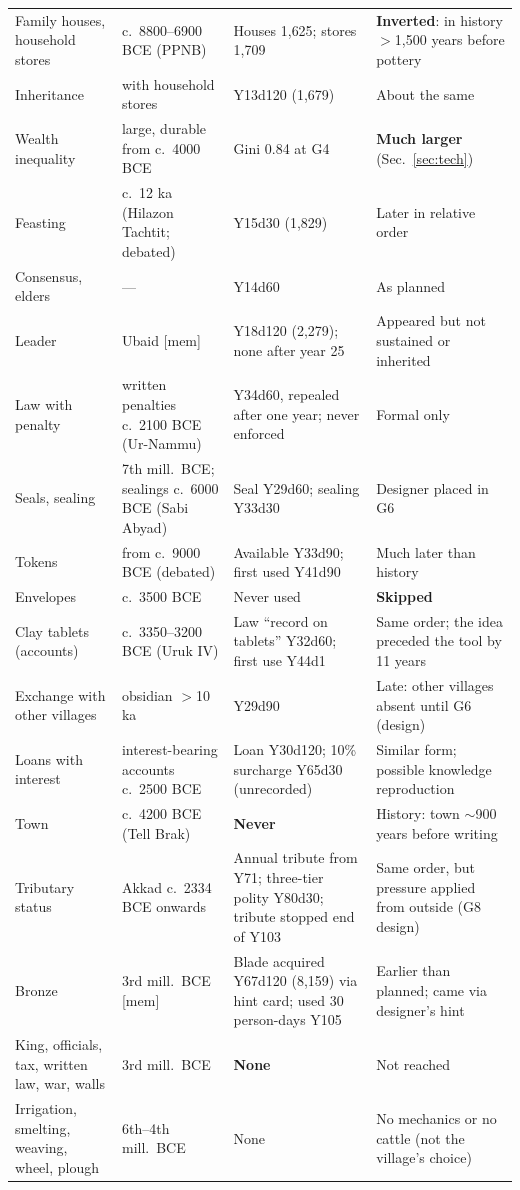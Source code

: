 \documentclass[11pt]{article}
\newcommand{\lbl}[1]{\textsf{[#1]}}
\begin{document}
\begin{table}[p]
\begin{tabularx}{\linewidth}{@{}>{\raggedright\arraybackslash}p{2.4cm} >{\raggedright\arraybackslash}p{3.4cm} L L@{}}
Family houses, household stores & c.\ 8800--6900 BCE (PPNB) & Houses 1{,}625; stores 1{,}709 & \textbf{Inverted}: in history $>$1{,}500 years before pottery \\
Inheritance & with household stores & Y13d120 (1{,}679) & About the same \\
Wealth inequality & large, durable from c.\ 4000 BCE \citep{bogaard2019farming} & Gini 0.84 at G4 & \textbf{Much larger} (Sec.~\ref{sec:tech}) \\
Feasting & c.\ 12 ka (Hilazon Tachtit; debated) & Y15d30 (1{,}829) & Later in relative order \\
Consensus, elders & --- & Y14d60 & As planned \\
Leader & Ubaid \lbl{mem} & Y18d120 (2{,}279); none after year 25 & Appeared but not sustained or inherited \\
Law with penalty & written penalties c.\ 2100 BCE (Ur-Nammu) & Y34d60, repealed after one year; never enforced & Formal only \\
Seals, sealing & 7th mill.\ BCE; sealings c.\ 6000 BCE (Sabi Abyad) & Seal Y29d60; sealing Y33d30 & Designer placed in G6 \\
Tokens & from c.\ 9000 BCE (debated) & Available Y33d90; first used Y41d90 & Much later than history \\
Envelopes & c.\ 3500 BCE & Never used & \textbf{Skipped} \\
Clay tablets (accounts) & c.\ 3350--3200 BCE (Uruk IV) & Law ``record on tablets'' Y32d60; first use Y44d1 & Same order; the idea preceded the tool by 11 years \\
Exchange with other villages & obsidian $>$10 ka & Y29d90 & Late: other villages absent until G6 (design) \\
Loans with interest & interest-bearing accounts c.\ 2500 BCE & Loan Y30d120; 10\% surcharge Y65d30 (unrecorded) & Similar form; possible knowledge reproduction \\
Town & c.\ 4200 BCE (Tell Brak) & \textbf{Never} & History: town $\sim$900 years before writing \\
Tributary status & Akkad c.\ 2334 BCE onwards & Annual tribute from Y71; three-tier polity Y80d30; tribute stopped end of Y103 & Same order, but pressure applied from outside (G8 design) \\
Bronze & 3rd mill.\ BCE \lbl{mem} & Blade acquired Y67d120 (8{,}159) via hint card; used 30 person-days Y105 & Earlier than planned; came via designer's hint \\
King, officials, tax, written law, war, walls & 3rd mill.\ BCE & \textbf{None} & Not reached \\
Irrigation, smelting, weaving, wheel, plough & 6th--4th mill.\ BCE & None & No mechanics or no cattle (not the village's choice) \\
\bottomrule
\end{tabularx}
\end{table}
\end{document}
